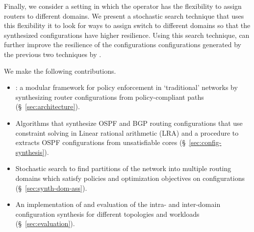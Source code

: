 Finally,  we consider a setting in which the operator has the flexibility to
assign routers to different domains.
We present a stochastic search technique that uses this flexibility it to look for
ways to assign switch to different domains so that the synthesized configurations have higher resilience.
Using this search technique, \name can further improve the resilience of the configurations 
configurations generated by the previous two techniques by
.




 We make the following contributions. 
\begin{itemize}
	\item \name: a modular framework 
	for policy enforcement in `traditional' networks
	by synthesizing router configurations from policy-compliant paths (\S~\ref{sec:architecture}). 
	\item Algorithms that synthesize OSPF and BGP routing configurations that use
	constraint solving in Linear rational arithmetic (LRA) and 
	a procedure to extracts OSPF configurations from 
	unsatisfiable cores (\S~\ref{sec:config-synthesis}). 
	\item Stochastic search to find 
	partitions of the network into multiple routing domains which
	satisfy policies and optimization objectives on configurations (\S~\ref{sec:synth-dom-ass}).
	\item An implementation of \name and evaluation of the 
	intra- and inter-domain configuration synthesis for different
	topologies and workloads (\S~\ref{sec:evaluation}). 
\end{itemize}
